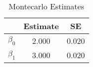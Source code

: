 \begin{table}[htb]
\centering
\caption{Montecarlo Estimates}
\label{table:ea3:ps1:q3a:tab2}
\begin{tabular}{lcc}
\hline
 & Estimate & SE \\
\hline\hline
$\beta_0$ & 2.000 & 0.020 \\
$\beta_1$ & 3.000 & 0.020 \\
\hline
\end{tabular}
\end{table}
